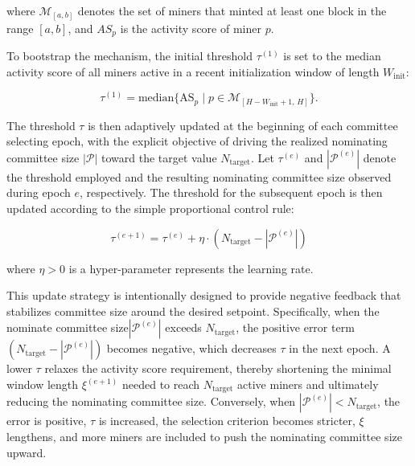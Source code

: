 \documentclass[journal]{IEEEtran}
\begin{document}
where $  \mathcal{M}_{[a,b]}  $ denotes the set of miners that minted at least one block in the range $  [a, b]  $, and $  AS_p  $ is the activity score of miner $  p  $.

To bootstrap the mechanism, the initial threshold $\tau^{(1)}$ is set to the median activity score of all miners active in a recent initialization window of length $W_{\text{init}}$:

\begin{equation}
\tau^{(1)} = \text{median} \bigl\{ \text{AS}_p \mid p \in \mathcal{M}_{[H-W_{\text{init}}+1,\, H]} \bigr\}.
\end{equation}

The threshold $  \tau  $ is then adaptively updated at the beginning of each committee selecting epoch, with the explicit objective of driving the realized nominating committee size $  |\mathcal{P}|  $ toward the target value $  N_{\text{target}}  $. Let $  \tau^{(e)}  $ and $  |\mathcal{P}^{(e)}|  $ denote the threshold employed and the resulting nominating committee size observed during epoch $  e  $, respectively. The threshold for the subsequent epoch is then updated according to the simple proportional control rule:

\begin{equation}
    \tau^{(e+1)} = \tau^{(e)} + \eta \cdot (N_{\text{target}} - |\mathcal{P}^{(e)}|)
\end{equation}

where \(\eta > 0\) is a hyper-parameter represents the learning rate.

This update strategy is intentionally designed to provide negative feedback that stabilizes committee size around the desired setpoint. Specifically, when the nominate committee size$  |\mathcal{P}^{(e)}|  $ exceeds $  N_{\text{target}}  $, the positive error term $  (N_{\text{target}} - |\mathcal{P}^{(e)}|)  $ becomes negative, which decreases $  \tau  $ in the next epoch. A lower $  \tau  $ relaxes the activity score requirement, thereby shortening the minimal window length $  \xi^{(e+1)}  $ needed to reach $  N_{\text{target}}  $ active miners and ultimately reducing the nominating committee size. Conversely, when $  |\mathcal{P}^{(e)}| < N_{\text{target}}  $, the error is positive, $  \tau  $ is increased, the selection criterion becomes stricter, $  \xi  $ lengthens, and more miners are included to push the nominating committee size upward.
\end{document}
